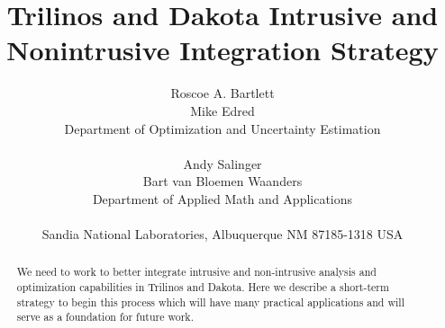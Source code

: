 \documentclass[pdf,ps2pdf,11pt]{SANDreport}
\title{\center
Trilinos and Dakota Intrusive and Nonintrusive Integration Strategy}
\author{
Roscoe A. Bartlett \\
Mike Edred \\
Department of Optimization and Uncertainty Estimation \\ \\
Andy Salinger \\
Bart van Bloemen Waanders \\
Department of Applied Math and Applications \\ \\
Sandia National Laboratories, Albuquerque NM 87185-1318 USA \\ }
\begin{document}
\maketitle

%


%
\begin{abstract}
%

We need to work to better integrate intrusive and non-intrusive analysis and
optimization capabilities in Trilinos and Dakota.  Here we describe a
short-term strategy to begin this process which will have many practical
applications and will serve as a foundation for future work.

%
\end{abstract}
%

%

%

%
\clearpage
\tableofcontents

\end{document}
